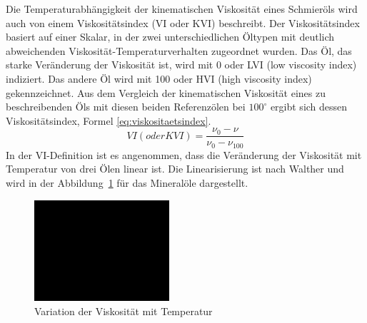 Die Temperaturabhängigkeit der kinematischen Viskosität eines Schmieröls wird auch von einem Viskositätsindex (VI oder KVI) beschreibt.
Der Viskositätsindex basiert auf einer Skalar, in der zwei unterschiedlichen Öltypen mit deutlich abweichenden Viskosität-Temperaturverhalten zugeordnet wurden.
Das Öl, das starke Veränderung der Viskosität ist, wird mit 0 oder LVI (low viscosity index) indiziert.
Das andere Öl wird mit 100 oder HVI (high viscosity index) gekennzeichnet.
Aus dem Vergleich der kinematischen Viskosität eines zu beschreibenden Öls mit diesen beiden Referenzölen bei $100^\circ$  ergibt sich dessen Viskositätsindex, Formel \ref{eq:viskositaetsindex}.
\begin{equation}
    VI (oder KVI) = \frac{\nu_0 - \nu}{\nu_0 - \nu_{100}}
    \label{eq:viskositaetsindex}
\end{equation}
%
In der VI-Definition ist es angenommen, dass die Veränderung der Viskosität mit Temperatur von drei Ölen linear ist.
Die Linearisierung ist nach Walther\cite{walther} und wird in der Abbildung~\ref{fig:variation_der_viskositaet_mit_temperatur} für das Mineralöle dargestellt.
\begin{figure}[htb]
    \centering
    \includegraphics[width=5cm]{./images/blank_img.jpg}
    \caption{Variation der Viskosität mit Temperatur}
    \label{fig:variation_der_viskositaet_mit_temperatur}
\end{figure}

